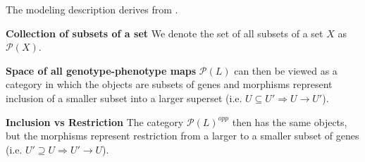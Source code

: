 \begin{frame}
The modeling description derives from \cite{Abramsky2011}.
\begin{block}{\textbf{Collection of subsets of a set}}
We denote the set of all subsets of a set $X$ as $\mathcal{P}(X)$.
\end{block}
\begin{block}{\textbf{Space of all genotype-phenotype maps}}
$\mathcal{P}(L)$ can then be viewed as a category in which the objects are subsets of genes and morphisms represent inclusion of a smaller subset into a larger superset (i.e. $U \subseteq U' \Rightarrow U \rightarrow U'$).
\end{block}
\begin{block}{\textbf{Inclusion vs Restriction}}
The category $\mathcal{P}(L)^{opp}$ then has the same objects, but the morphisms represent restriction from a larger to a smaller subset of genes (i.e. $U' \supseteq U \Rightarrow U' \rightarrow U$).
\end{block}
\end{frame}



